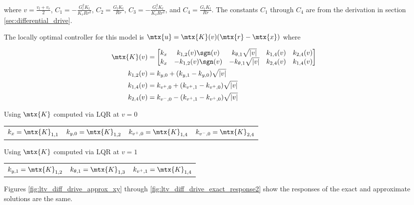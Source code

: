 \begin{theorem}
  where $v = \frac{v_l + v_r}{2}$, $C_1 = -\frac{G_l^2 K_t}{K_v R r^2}$,
  $C_2 = \frac{G_l K_t}{Rr}$, $C_3 = -\frac{G_r^2 K_t}{K_v R r^2}$, and
  $C_4 = \frac{G_r K_t}{Rr}$. The constants $C_1$ through $C_4$ are from the
  derivation in section \ref{sec:differential_drive}.

  The locally optimal controller for this model is
  $\mtx{u} = \mtx{K}(v) (\mtx{r} - \mtx{x})$ where

  \begin{align}
    \mtx{K}(v) &= \begin{bmatrix}
      k_x & k_{1, 2}(v) \sgn(v) & k_{\theta, 1} \sqrt{|v|} & k_{1, 4}(v) &
        k_{2, 4}(v) \\
      k_x & -k_{1, 2}(v) \sgn(v) & -k_{\theta, 1} \sqrt{|v|} & k_{2, 4}(v) &
        k_{1, 4}(v)
    \end{bmatrix} \\
    k_{1, 2}(v) &= k_{y, 0} + (k_{y, 1} - k_{y, 0}) \sqrt{|v|} \\
    k_{1, 4}(v) &= k_{v^+, 0} + (k_{v^+, 1} - k_{v^+, 0}) \sqrt{|v|} \\
    k_{2, 4}(v) &= k_{v^-, 0} - (k_{v^+, 1} - k_{v^+, 0}) \sqrt{|v|}
  \end{align}

  Using $\mtx{K}$ computed via LQR at $v = 0$
  \begin{figurekey}
    \begin{tabular}{llll}
      $k_x = \mtx{K}_{1, 1}$ &
        $k_{y, 0} = \mtx{K}_{1, 2}$ &
        $k_{v^+, 0} = \mtx{K}_{1, 4}$ &
        $k_{v^-, 0} = \mtx{K}_{2, 4}$
    \end{tabular}
  \end{figurekey}

  Using $\mtx{K}$ computed via LQR at $v = 1$
  \begin{figurekey}
    \begin{tabular}{lll}
        $k_{y, 1} = \mtx{K}_{1, 2}$ &
        $k_{\theta, 1} = \mtx{K}_{1, 3}$ &
        $k_{v^+, 1} = \mtx{K}_{1, 4}$
    \end{tabular}
  \end{figurekey}
\end{theorem}

Figures \ref{fig:ltv_diff_drive_approx_xy} through
\ref{fig:ltv_diff_drive_exact_response2} show the responses of the exact
and approximate solutions are the same.

